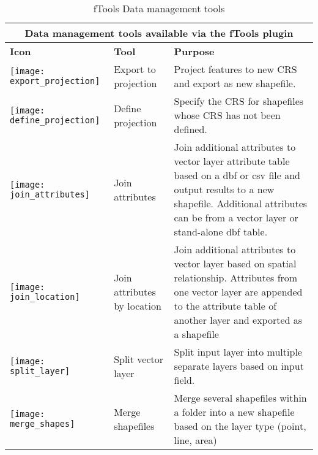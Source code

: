 \begin{table}[ht]
\centering
\begin{tabular}{|m{1cm}|m{3cm}|m{9cm}|}
 \hline \multicolumn{3}{|c|}{\textbf{Data management tools available via the fTools plugin}} \\
 \hline \textbf{Icon} & \textbf{Tool} & \textbf{Purpose} \\
 \hline \texttt{[image: export\_projection]} & Export to projection & 
Project features to new CRS and export as new shapefile. \\
 \hline \texttt{[image: define\_projection]} & Define projection & 
Specify the CRS for shapefiles whose CRS has not been defined. \\
 \hline \texttt{[image: join\_attributes]} & Join attributes & Join 
additional attributes to vector layer attribute table based on a dbf or csv file 
and output results to a new shapefile. Additional attributes can be from a 
vector layer or stand-alone dbf table. \\
 \hline \texttt{[image: join\_location]} & Join attributes by 
location & Join additional attributes to vector layer based on spatial 
relationship. Attributes from one vector layer are appended to the attribute 
table of another layer and exported as a shapefile \\
 \hline \texttt{[image: split\_layer]} & Split vector layer & 
Split input layer into multiple separate layers based on input field. \\
 \hline \texttt{[image: merge\_shapes]} & Merge shapefiles &
Merge several shapefiles within a folder into a new shapefile based on the 
layer type (point, line, area) \\
 \hline
\end{tabular}
\caption{fTools Data management tools}\label{tab:fTool_data_management}
\end{table}

\FloatBarrier
